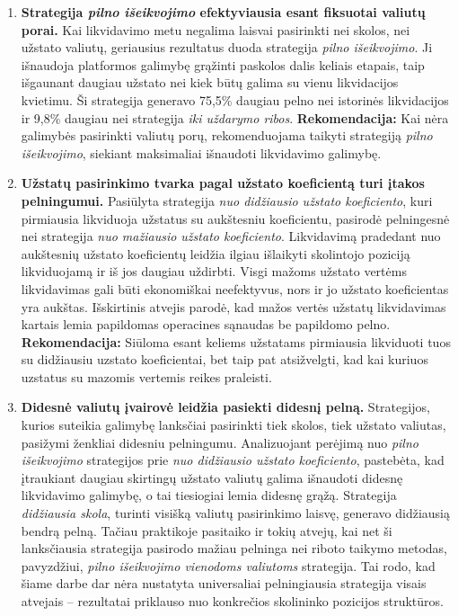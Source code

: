 \documentclass[]{VUMIFTemplateClass}
\begin{document}


\begin{enumerate}
\item \textbf{Strategija \textit{pilno išeikvojimo} efektyviausia esant fiksuotai valiutų porai.}  
Kai likvidavimo metu negalima laisvai pasirinkti nei skolos, nei užstato valiutų, geriausius rezultatus duoda strategija \textit{pilno išeikvojimo}. Ji išnaudoja platformos galimybę grąžinti paskolos dalis keliais etapais, taip išgaunant daugiau užstato nei kiek būtų galima su vienu likvidacijos kvietimu. Ši strategija generavo 75,5\% daugiau pelno nei istorinės likvidacijos ir 9,8\% daugiau nei strategija \textit{iki uždarymo ribos}.  
\textbf{Rekomendacija:} Kai nėra galimybės pasirinkti valiutų porų, rekomenduojama taikyti strategiją \textit{pilno išeikvojimo}, siekiant maksimaliai išnaudoti likvidavimo galimybę.

\item \textbf{Užstatų pasirinkimo tvarka pagal užstato koeficientą turi įtakos pelningumui.}  
Pasiūlyta strategija \textit{nuo didžiausio užstato koeficiento}, kuri pirmiausia likviduoja užstatus su aukštesniu koeficientu, pasirodė pelningesnė nei strategija \textit{nuo mažiausio užstato koeficiento}. Likvidavimą pradedant nuo aukštesnių užstato koeficientų leidžia ilgiau išlaikyti skolintojo poziciją likviduojamą ir iš jos daugiau uždirbti.
Visgi mažoms užstato vertėms likvidavimas gali būti ekonomiškai neefektyvus, nors ir jo užstato koeficientas yra aukštas. Išskirtinis atvejis parodė, kad mažos vertės užstatų likvidavimas kartais lemia papildomas operacines sąnaudas be papildomo pelno.
\textbf{Rekomendacija:} 
Siūloma esant keliems užstatams pirmiausia likviduoti tuos su didžiausiu uzstato koeficientai, bet taip pat atsižvelgti, kad kai kuriuos uzstatus su mazomis vertemis reikes praleisti.

\item \textbf{Didesnė valiutų įvairovė leidžia pasiekti didesnį pelną.}
Strategijos, kurios suteikia galimybę lanksčiai pasirinkti tiek skolos, tiek užstato valiutas, pasižymi ženkliai didesniu pelningumu. Analizuojant perėjimą nuo \textit{pilno išeikvojimo} strategijos prie \textit{nuo didžiausio užstato koeficiento}, pastebėta, kad įtraukiant daugiau skirtingų užstato valiutų galima išnaudoti didesnę likvidavimo galimybę, o tai tiesiogiai lemia didesnę grąžą. Strategija \textit{didžiausia skola}, turinti visišką valiutų pasirinkimo laisvę, generavo didžiausią bendrą pelną. Tačiau praktikoje pasitaiko ir tokių atvejų, kai net ši lanksčiausia strategija pasirodo mažiau pelninga nei riboto taikymo metodas, pavyzdžiui, \textit{pilno išeikvojimo vienodoms valiutoms} strategija. Tai rodo, kad šiame darbe dar nėra nustatyta universaliai pelningiausia strategija visais atvejais – rezultatai priklauso nuo konkrečios skolininko pozicijos struktūros.


\end{enumerate}
\end{document}
